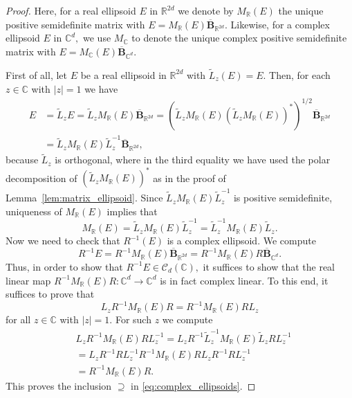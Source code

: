 \documentclass{article}
\theoremstyle{definition}
\theoremstyle{remark}
\numberwithin{equation}{section}
\newcommand{\reals}{\mathbb{R}}
\newcommand{\complex}{\mathbb{C}}
\newcommand{\1}{\mathbf{1}}
\begin{document}
    \begin{proof}   
     Here, for a real ellipsoid $E$ in $\reals^{2d}$ we denote by $M_\reals(E)$ the unique positive semidefinite matrix with $E = M_{\reals}(E)\mathbf{\overline{B}}_{\reals^{2d}}.$
     Likewise, for a complex ellipsoid $E$ in $\complex^d,$ we use $M_\complex$ to denote the unique complex positive semidefinite matrix with $E = M_{\complex}(E)\mathbf{\overline{B}}_{\complex^{d}}.$
     
     First of all, let $E$ be a real ellipsoid in $\reals^{2d}$  with $\widetilde{L}_{z}(E)=E$. Then, for each $z\in\complex$ with $|z|=1$ we have
     \begin{align*}
     	E&=\widetilde{L}_{z}E=\widetilde{L}_{z}M_{\reals}(E)\mathbf{\overline{B}}_{\reals^{2d}}
        =(\widetilde{L}_{z}M_{\reals}(E)(\widetilde{L}_{z}M_{\reals}(E))^{*})^{1/2}\mathbf{\overline{B}}_{\reals^{2d}}\\
     	&=\widetilde{L}_{z}M_{\reals}(E)\widetilde{L}_{z}^{-1}\mathbf{\overline{B}}_{\reals^{2d}},
     \end{align*}
     because $\widetilde{L}_{z}$ is orthogonal, where in the third equality we have used the polar decomposition of $(\widetilde{L}_{z}M_{\reals}(E))^{*}$ as in the proof of Lemma~\ref{lem:matrix_ellipsoid}. Since $\widetilde{L}_{z}M_{\reals}(E)\widetilde{L}_{z}^{-1}$ is positive semidefinite, uniqueness of $M_{\reals}(E)$ implies that
     \begin{equation*}
     	M_{\reals}(E) = \widetilde{L}_{z}M_{\reals}(E)\widetilde{L}_{z}^{-1} = \widetilde{L}_{z}^{-1}M_{\reals}(E)\widetilde{L}_{z}.
     \end{equation*}
     Now we need to check that $R^{-1}(E)$ is a complex ellipsoid. We compute
     \begin{equation*}
     	R^{-1}E = R^{-1}M_{\reals}(E)\mathbf{\overline{B}}_{\reals^{2d}} = R^{-1}M_{\reals}(E)R\mathbf{\overline{B}}_{\complex^{d}}.
     \end{equation*}
     Thus, in order to show that $R^{-1}E\in\mathcal{C}_{d}(\complex),$ it suffices to show that the real linear map $R^{-1}M_{\reals}(E)R:\complex^{d}\to\complex^{d}$ is in fact complex linear. To this end, it suffices to prove that
     \begin{equation*}
     	L_{z}R^{-1}M_{\reals}(E)R = R^{-1}M_{\reals}(E)RL_{z}
     \end{equation*}
     for all $z\in\complex$ with $|z|=1$. For such $z$ we compute
     \begin{align*}
     	&L_{z}R^{-1}M_{\reals}(E)RL_{z}^{-1}=L_{z}R^{-1}\widetilde{L}_{z}^{-1}M_{\reals}(E)\widetilde{L}_{z}RL_{z}^{-1}\\
     	&=L_{z}R^{-1}RL_{z}^{-1}R^{-1}M_{\reals}(E)RL_{z}R^{-1}RL_{z}^{-1}\\
     	&=R^{-1}M_{\reals}(E)R.
     \end{align*}
	This proves the inclusion $\supseteq$ in \eqref{eq:complex_ellipsoids}.
	

\end{proof}
\end{document}
